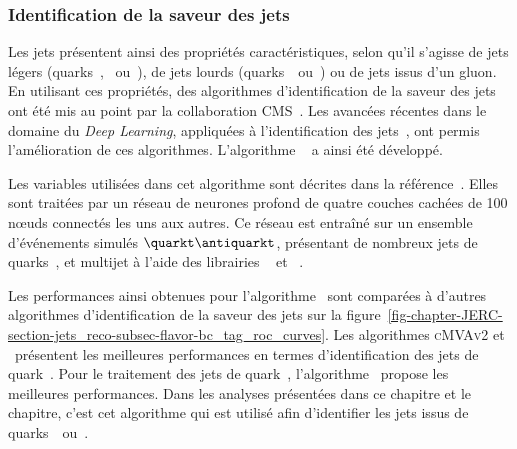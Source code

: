 \subsubsection{Identification de la saveur des jets}
Les jets présentent ainsi des propriétés caractéristiques, selon qu'il s'agisse de jets légers (quarks~\quarkd, \quarku\ ou~\quarks), de jets lourds (quarks~\quarkc\ ou~\quarkb) ou de jets issus d'un gluon.
En utilisant ces propriétés, des algorithmes d'identification de la saveur des jets ont été mis au point par la collaboration CMS~\cite{jet_btag_CSV_RunI}.
Les avancées récentes dans le domaine du \emph{Deep Learning}, appliquées à l'identification des jets~\cite{jet_flavor_deep_nn}, ont permis l'amélioration de ces algorithmes. L'algorithme \DeepCSV~\cite{Sirunyan_heavy_flavor_jets_2018} a ainsi été développé.
\par Les variables utilisées dans cet algorithme sont décrites dans la référence~\cite{Sirunyan_heavy_flavor_jets_2018}.
Elles sont traitées par un réseau de neurones profond de quatre couches cachées de 100 nœuds connectés les uns aux autres.
Ce réseau est entraîné sur un ensemble d'événements simulés $\quarkt\antiquarkt$, présentant de nombreux jets de quarks~\quarkb, et multijet à l'aide des librairies
\KERAS~\cite{keras}
et
\TENSORFLOW~\cite{tensorflow}.
\par Les performances ainsi obtenues pour l'algorithme \DeepCSV\ sont comparées à d'autres algorithmes d'identification de la saveur des jets sur la figure~\ref{fig-chapter-JERC-section-jets_reco-subsec-flavor-bc_tag_roc_curves}.
Les algorithmes \textsc{cMVAv2} et \DeepCSV\ présentent les meilleures performances en termes d'identification des jets de quark~\quarkb.
Pour le traitement des jets de quark~\quarkc, l'algorithme \DeepCSV\ propose les meilleures performances.
Dans les analyses présentées dans ce chapitre et le chapitre, c'est cet algorithme qui est utilisé afin d'identifier les jets issus de quarks~\quarkc\ ou~\quarkb.
